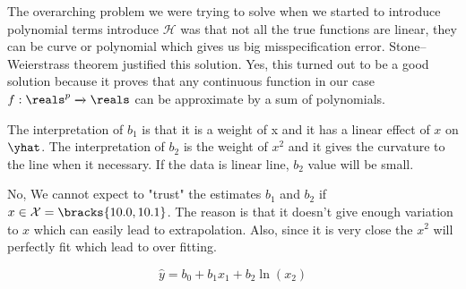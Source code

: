 \documentclass[12pt]{article}
\begin{document}
\begin{enumerate}


The overarching problem we were trying to solve when we started to introduce polynomial terms introduce $\mathcal{H}$ was that not all the true functions are linear, they can be curve or polynomial which gives us big misspecification error. Stone–Weierstrass theorem justified this solution. Yes, this turned out to be a good solution because it proves that any continuous function in our case $f: \reals^p \xrightarrow{} \reals$ can be approximate by a sum of polynomials.


The interpretation of $b_1$ is that it is a weight of x and it has a linear effect of $x$ on $\yhat$. The interpretation of $b_2$ is the weight of $x^2$ and it gives the curvature to the line when it necessary. If the data is linear line, $b_2$ value will be small.


No, We cannot expect to "trust" the estimates $b_1$ and $b_2$ if $x \in \mathcal{X} = \bracks{10.0, 10.1}$. The reason is that it doesn't give enough variation to $x$ which can easily lead to extrapolation. Also, since it is very close the $x^2$ will perfectly fit which lead to over fitting.


\[
\hat{y} = b_0 + b_1 x_1 + b_2 \ln(x_2)
\]


\end{enumerate}
\end{document}
